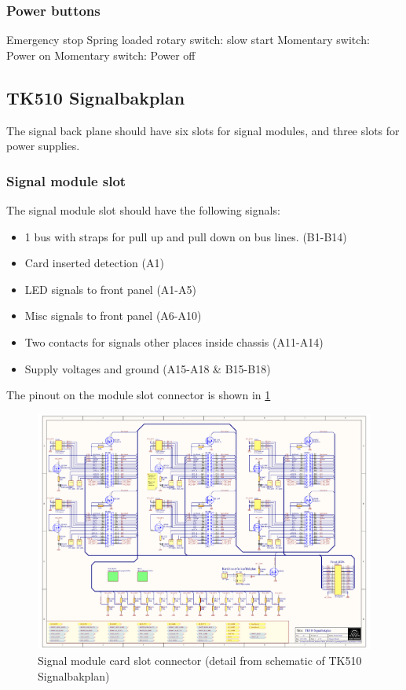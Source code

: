 \subsubsection*{Power buttons}
Emergency stop
Spring loaded rotary switch: slow start
Momentary switch: Power on
Momentary switch: Power off

\subsection*{TK510 Signalbakplan}
The signal back plane should have six slots for signal modules, and three slots for power supplies.

\subsubsection*{Signal module slot}
The signal module slot should have the following signals:
\begin{itemize}
    \item 1 bus with straps for pull up and pull down on bus lines. (B1-B14)
    \item Card inserted detection (A1)
    \item LED signals to front panel (A1-A5)
    \item Misc signals to front panel (A6-A10)
    \item Two contacts for signals other places inside chassis (A11-A14)
    \item Supply voltages and ground (A15-A18 \& B15-B18)
\end{itemize}
The pinout on the module slot connector is shown in \cref{fig:signalmodulslot}

\begin{figure}[h]
    \centering
    \includegraphics[trim={4.1cm 14.3cm 21.2cm 3.3cm},clip,width=\textwidth]{img/TK510_Signalbakplan.pdf}
    \caption{Signal module card slot connector (detail from schematic of TK510 Signalbakplan)}
    \label{fig:signalmodulslot}
\end{figure}

